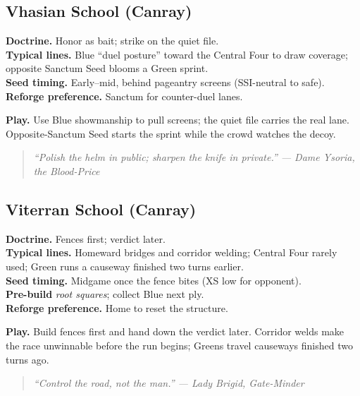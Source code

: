 \documentclass[11pt]{article}
\providecommand{\playdesc}[1]{\par\smallskip\noindent\small\textbf{Play.} #1\par}
\begin{document}
\subsection*{Vhasian School (Canray)}
\textbf{Doctrine.} Honor as bait; strike on the quiet file.\\
\textbf{Typical lines.} Blue ``duel posture'' toward the Central Four to draw coverage; opposite Sanctum Seed blooms a Green sprint.\\
\textbf{Seed timing.} Early–mid, behind pageantry screens (SSI-neutral to safe).\\
\textbf{Reforge preference.} Sanctum for counter-duel lanes.
\playdesc{Use Blue showmanship to pull screens; the quiet file carries the real lane. Opposite-Sanctum Seed starts the sprint while the crowd watches the decoy.}
\begin{quote}\small\itshape
“Polish the helm in public; sharpen the knife in private.” — Dame Ysoria, the Blood-Price
\end{quote}
\subsection*{Viterran School (Canray)}
\textbf{Doctrine.} Fences first; verdict later.\\
\textbf{Typical lines.} Homeward bridges and corridor welding; Central Four rarely used; Green runs a causeway finished two turns earlier.\\
\textbf{Seed timing.} Midgame once the fence bites (XS low for opponent).\\
\textbf{Pre-build} \emph{root squares}; collect Blue next ply. \\
\textbf{Reforge preference.} Home to reset the structure.
\playdesc{Build fences first and hand down the verdict later. Corridor welds make the race unwinnable before the run begins; Greens travel causeways finished two turns ago.}
\begin{quote}\small\itshape
“Control the road, not the man.” — Lady Brigid, Gate-Minder
\end{quote}

\end{document}

